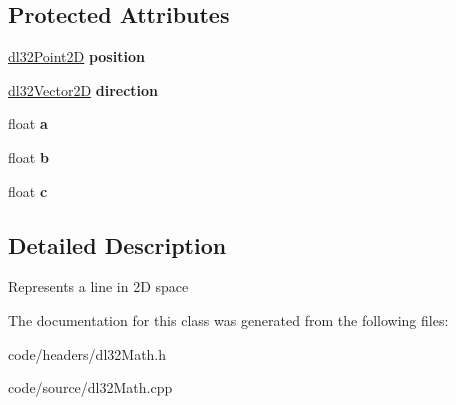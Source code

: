 \subsection*{Protected Attributes}
\begin{DoxyCompactItemize}
\item 
\hypertarget{classdl32_line2_d_abec1d8883d1b1651cf268a8f28e56457}{\hyperlink{structdl32_point2_d}{dl32\-Point2\-D} {\bfseries position}}\label{classdl32_line2_d_abec1d8883d1b1651cf268a8f28e56457}

\item 
\hypertarget{classdl32_line2_d_ac77150c2eb0cfd7d7b7aa439869049d0}{\hyperlink{structdl32_vector2_d}{dl32\-Vector2\-D} {\bfseries direction}}\label{classdl32_line2_d_ac77150c2eb0cfd7d7b7aa439869049d0}

\item 
\hypertarget{classdl32_line2_d_a1bf15e964ee0be5bfaf76d544ae11d3f}{float {\bfseries a}}\label{classdl32_line2_d_a1bf15e964ee0be5bfaf76d544ae11d3f}

\item 
\hypertarget{classdl32_line2_d_a79b0b42e65e9e7a8cbaa487f0aeec3da}{float {\bfseries b}}\label{classdl32_line2_d_a79b0b42e65e9e7a8cbaa487f0aeec3da}

\item 
\hypertarget{classdl32_line2_d_aa475633adc5c7f1f5989defd944c5b13}{float {\bfseries c}}\label{classdl32_line2_d_aa475633adc5c7f1f5989defd944c5b13}

\end{DoxyCompactItemize}


\subsection{Detailed Description}
Represents a line in 2\-D space 

The documentation for this class was generated from the following files\-:\begin{DoxyCompactItemize}
\item 
code/headers/dl32\-Math.\-h\item 
code/source/dl32\-Math.\-cpp\end{DoxyCompactItemize}
